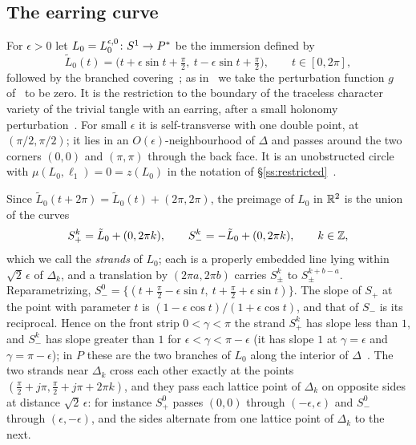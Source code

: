 \subsection{The earring curve}\label{ss:earring}
For $\epsilon>0$ let $L_0=L_0^{\epsilon,0}\colon S^1\to P^{*}$ be the immersion defined by
\begin{equation}\label{eq:L0}
\tilde L_0(t)=\bigl(t+\epsilon\sin t+\tfrac\pi2,\ t-\epsilon\sin t+\tfrac\pi2\bigr),\qquad t\in[0,2\pi],
\end{equation}
followed by the branched covering~\cite[Def.~3.4, (13)]{HHK2}; as in~\cite[\S11]{HHK2} we take the perturbation
function $g$ of~\cite[(13)]{HHK2} to be zero. It is the restriction to the boundary of the
traceless character variety of the trivial tangle with an earring, after a small holonomy
perturbation~\cite[Thm.~6.2]{HHK2}. For small $\epsilon$ it is self-transverse with one double point, at
$(\pi/2,\pi/2)$; it lies in an $O(\epsilon)$-neighbourhood of $\Delta$ and passes around the two corners
$(0,0)$ and $(\pi,\pi)$ through the back face. It is an unobstructed circle with
$\mu(L_0,\ell_1)=0=z(L_0)$ in the notation of \S\ref{ss:restricted}~\cite[pp.~16,~18]{HHK2}.

Since $\tilde L_0(t+2\pi)=\tilde L_0(t)+(2\pi,2\pi)$, the preimage of $L_0$ in $\mathbb{R}^2$ is the union of the
curves
\[
S^k_+=\tilde L_0+(0,2\pi k),\qquad S^k_-=-\tilde L_0+(0,2\pi k),\qquad k\in\mathbb{Z},
\]
which we call the \emph{strands} of $L_0$; each is a properly embedded line lying within $\sqrt2\,\epsilon$ of
$\Delta_k$, and a translation by $(2\pi a,2\pi b)$ carries $S^k_\pm$ to $S^{k+b-a}_\pm$. Reparametrizing,
$S^0_-=\{(t+\frac\pi2-\epsilon\sin t,\ t+\frac\pi2+\epsilon\sin t)\}$. The slope of $S_+$ at the point with
parameter $t$ is $(1-\epsilon\cos t)/(1+\epsilon\cos t)$, and that of $S_-$ is its reciprocal. Hence on the
front strip $0<\gamma<\pi$ the strand $S^k_+$ has slope less than $1$, and $S^k_-$ has slope greater than $1$ for
$\epsilon<\gamma<\pi-\epsilon$ (it has slope $1$ at $\gamma=\epsilon$ and $\gamma=\pi-\epsilon$);
in $P$ these are the two branches of $L_0$ along the interior of $\Delta$~\cite[\S5.1]{HHK2}. The two
strands near $\Delta_k$ cross each other exactly at the points $(\frac\pi2+j\pi,\frac\pi2+j\pi+2\pi k)$, and they
pass each lattice point of $\Delta_k$ on opposite sides at distance $\sqrt2\,\epsilon$: for instance $S^0_+$ passes
$(0,0)$ through $(-\epsilon,\epsilon)$ and $S^0_-$ through $(\epsilon,-\epsilon)$, and the sides alternate from one
lattice point of $\Delta_k$ to the next.

